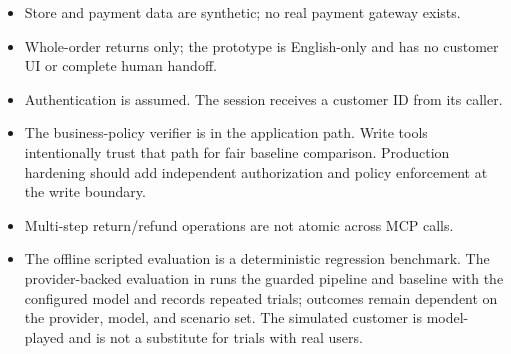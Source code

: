 \documentclass[11pt,a4paper]{article}
\begin{document}
\begin{itemize}
\item Store and payment data are synthetic; no real payment gateway exists.
\item Whole-order returns only; the prototype is English-only and has no customer UI or complete human handoff.
\item Authentication is assumed. The session receives a customer ID from its caller.
\item The business-policy verifier is in the application path. Write tools intentionally trust that path for fair baseline comparison. Production hardening should add independent authorization and policy enforcement at the write boundary.
\item Multi-step return/refund operations are not atomic across MCP calls.
\item The offline scripted evaluation is a deterministic regression benchmark. The provider-backed evaluation in  runs the guarded pipeline and baseline with the configured model and records repeated trials; outcomes remain dependent on the provider, model, and scenario set. The simulated customer is model-played and is not a substitute for trials with real users.
\end{itemize}
\end{document}
